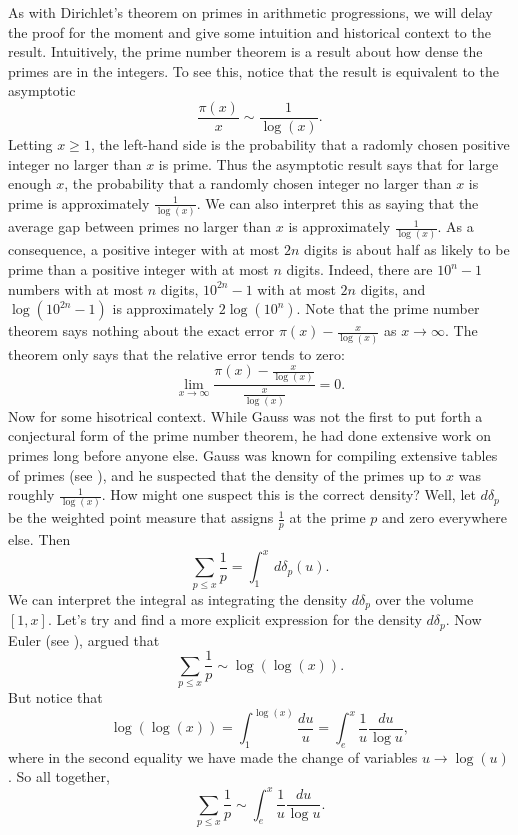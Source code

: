 \documentclass[12pt]{book}
\theoremstyle{definition}\newframedtheorem{method}{Method}
\renewcommand{\d}{\delta}
\newcommand{\<}{\langle}
\renewcommand{\>}{\rangle}
\begin{document}
      As with Dirichlet's theorem on primes in arithmetic progressions, we will delay the proof for the moment and give some intuition and historical context to the result. Intuitively, the prime number theorem is a result about how dense the primes are in the integers. To see this, notice that the result is equivalent to the asymptotic
      \[
        \frac{\pi(x)}{x} \sim \frac{1}{\log(x)}.
      \]
      Letting $x \ge 1$, the left-hand side is the probability that a radomly chosen positive integer no larger than $x$ is prime. Thus the asymptotic result says that for large enough $x$, the probability that a randomly chosen integer no larger than $x$ is prime is approximately $\frac{1}{\log(x)}$. We can also interpret this as saying that the average gap between primes no larger than $x$ is approximately $\frac{1}{\log(x)}$. As a consequence, a positive integer with at most $2n$ digits is about half as likely to be prime than a positive integer with at most $n$ digits. Indeed, there are $10^{n}-1$ numbers with at most $n$ digits, $10^{2n}-1$ with at most $2n$ digits, and $\log(10^{2n}-1)$ is approximately $2\log(10^{n})$. Note that the prime number theorem says nothing about the exact error $\pi(x)-\frac{x}{\log(x)}$ as $x \to \infty$. The theorem only says that the relative error tends to zero:
      \[
        \lim_{x \to \infty}\frac{\pi(x)-\frac{x}{\log(x)}}{\frac{x}{\log(x)}} = 0.
      \]
      Now for some hisotrical context. While Gauss was not the first to put forth a conjectural form of the prime number theorem, he had done extensive work on primes long before anyone else. Gauss was known for compiling extensive tables of primes (see \cite{gauss1872tafel}), and he suspected that the density of the primes up to $x$ was roughly $\frac{1}{\log(x)}$. How might one suspect this is the correct density? Well, let $d\d_{p}$ be the weighted point measure that assigns $\frac{1}{p}$ at the prime $p$ and zero everywhere else. Then
      \[
        \sum_{p \le x}\frac{1}{p} = \int_{1}^{x}\,d\d_{p}(u).
      \]
      We can interpret the integral as integrating the density $d\d_{p}$ over the volume $[1,x]$. Let's try and find a more explicit expression for the density $d\d_{p}$. Now Euler (see \cite{euler1737variae}), argued that
      \[
        \sum_{p \le x}\frac{1}{p} \sim \log(\log(x)).
      \]
      But notice that
      \[
        \log(\log(x)) = \int_{1}^{\log(x)}\frac{du}{u} = \int_{e}^{x}\frac{1}{u}\frac{du}{\log{u}},
      \]
      where in the second equality we have made the change of variables $u \to \log(u)$. So all together,
      \[
        \sum_{p \le x}\frac{1}{p} \sim \int_{e}^{x}\frac{1}{u}\frac{du}{\log{u}}.
      \]
\end{document}
